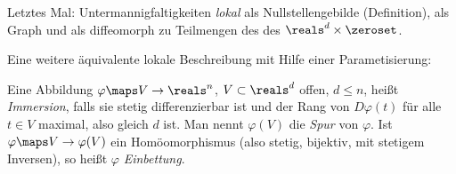 Letztes Mal: Untermannigfaltigkeiten \emph{lokal} als Nullstellengebilde (Definition), als Graph und als diffeomorph zu Teilmengen des des \( \reals^d\times\zeroset \).

Eine weitere äquivalente lokale Beschreibung mit Hilfe einer Parametisierung:
\begin{definition}
  Eine Abbildung \( \varphi\maps V\to \reals^n \), \( V\subset \reals^d \) offen, \( d\leq n \), heißt \emph{Immersion}, falls sie stetig differenzierbar ist und der Rang von \( D\varphi(t) \) für alle \( t\in V \) maximal, also gleich \( d \) ist. Man nennt \( \varphi(V) \) die \emph{Spur} von \( \varphi \). Ist \( \varphi\maps V\to \varphi(V) \) ein Homöomorphismus (also stetig, bijektiv, mit stetigem Inversen), so heißt \( \varphi \) \emph{Einbettung}. 
\end{definition}
